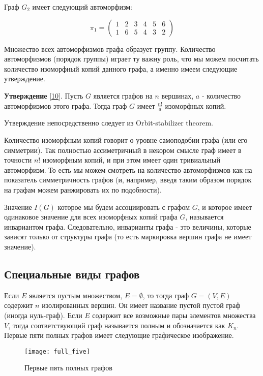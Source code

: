 \documentclass{article}
\begin{document}
Граф $G_2$ имеет следующий автоморфизм:

$$
\pi_1 = 
\left(\begin{array}{cccccc}
1 & 2 & 3 & 4 & 5 & 6 \\
1 & 6 & 5 & 4 & 3 & 2
\end{array}\right)
$$

\newpage

Множество всех автоморфизмов графа образует группу. Количество автоморфизмов (порядок группы) играет ту важну роль, что мы можем посчитать количество изоморфный копий данного графа, а именно имеем следующие утверждение.

\textbf{Утверждение} \hyperlink{orbit_theorem}{[10]}. Пусть $G$ является графов на $n$ вершинах, $a$ - количество автоморфизмов этого графа. Тогда граф $G$ имеет $\frac{n!}{a}$ изоморфных копий. 

Утверждение непосредственно следует из Orbit-stabilizer theorem.

Количество изоморфным копий говорит о уровне самоподобии графа (или его симметрии). Так полностью ассиметричный в некором смысле граф имеет в точности $n!$ изоморфным копий, и при этом имеет один тривиальный автоморфизм. То есть мы можем смотреть на количество автоморфизмов как на показатель симметричность графов (и, например, введя таким образом порядок на графам можем ранжировать их по подобности).

Значение $I(G)$ которое мы будем ассоциировать с графом $G$, и которое имеет одинаковое значение для всех изоморфных копий графа $G$, называется инвариантом графа. Следовательно, инварианты графа - это величины, которые зависят только от структуры графа (то есть маркировка вершин графа не имеет значение).

\subsection{Специальные виды графов}

Если $E$ является пустым множеством, $E = \emptyset$, то тогда граф $G = (V, E)$ содержит $n$ изолированных вершин. Он имеет название пустой пустой граф (иногда нуль-граф). Если $E$ содержит все возможные пары элементов множества $V$, тогда соответствующий граф называется полным и обозначается как $K_n$. Первые пяти полных графов имеет следующие графическое изображение.


\begin{figure}[h]
\texttt{[image: full\_five]}
\centering
\caption{Первые пять полных графов}
\end{figure}
\end{document}
